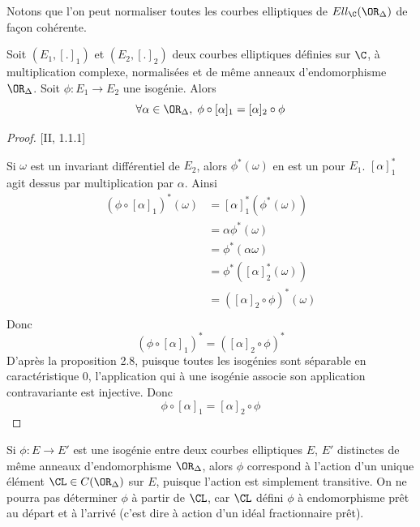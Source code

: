 Notons que l'on peut normaliser toutes les courbes elliptiques de $Ell_{\C}(\OR_{\Delta})$ de façon cohérente.

\begin{Prop}
	Soit $(E_1,[.]_1)$ et $(E_2,[.]_2)$ deux courbes elliptiques définies sur $\C$, à multiplication complexe, normalisées et de même anneaux d'endomorphisme $\OR_{\Delta}$. Soit $\phi : E_1 \rightarrow E_2$ une isogénie. Alors 
	\begin{equation*}
		\forall\alpha\in\OR_{\Delta},\;\phi\circ[\alpha]_1 = [\alpha]_2\circ\phi
	\end{equation*}
\end{Prop}

\begin{proof}\cite{Sil94}[II, 1.1.1]
	
	Si $\omega$ est un invariant différentiel de $E_2$, alors $\phi^{*}(\omega)$ en est un pour $E_1$. $[\alpha]_{1}^{*}$ agit dessus par multiplication par $\alpha$. Ainsi
	\begin{align*}
		(\phi\circ[\alpha]_1)^{*}(\omega) &= [\alpha]_{1}^{*}(\phi^{*}(\omega))\\
		&= \alpha\phi^{*}(\omega)\\
		&= \phi^{*}(\alpha\omega)\\
		&= \phi^{*}([\alpha]_{2}^{*}(\omega))\\
		&= ([\alpha]_2\circ\phi)^{*}(\omega)\\
	\end{align*}
	Donc 
	\begin{equation*}
		(\phi\circ[\alpha]_1)^{*} = ([\alpha]_2\circ\phi)^{*}
	\end{equation*}
	D'après la proposition 2.8, puisque toutes les isogénies sont séparable en caractéristique 0, l'application qui à une isogénie associe son application contravariante est injective. Donc 
	\begin{equation*}
		\phi\circ[\alpha]_1 = [\alpha]_2\circ\phi
	\end{equation*}
\end{proof}

Si $\phi : E \rightarrow E'$ est une isogénie entre deux courbes elliptiques $E$, $E'$ distinctes de même anneaux d'endomorphisme $\OR_{\Delta}$, alors $\phi$ correspond à l'action d'un unique élément $\CL\in C(\OR_{\Delta})$ sur $E$, puisque l'action est simplement transitive. On ne pourra pas déterminer $\phi$ à partir de $\CL$, car $\CL$ défini $\phi$ à endomorphisme prêt au départ et à l'arrivé (c'est dire à action d'un idéal fractionnaire prêt). 










